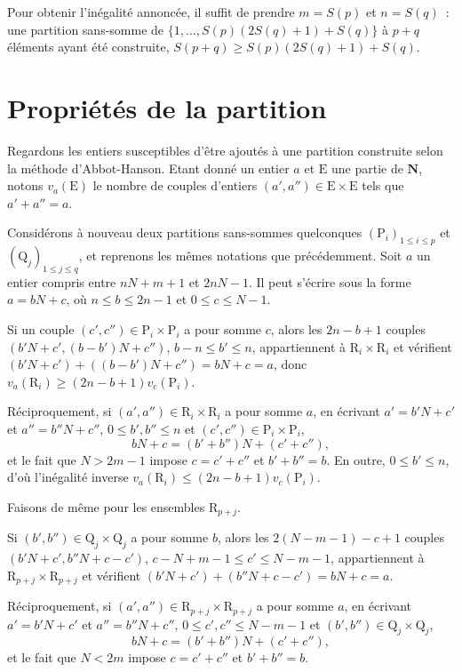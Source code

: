 \documentclass[11pt, oneside]{article}
\begin{document}
Pour obtenir l'inégalité annoncée, il suffit de prendre $m = S(p)$ et $n = S(q)$~:
une partition sans-somme de $\{1, \dots, S(p)(2S(q)+1) + S(q) \}$ à $p+q$ éléments ayant été construite, $S(p+q) \geqslant S(p)(2S(q)+1) + S(q)$.

\section{Propriétés de la partition}

Regardons les entiers susceptibles d'être ajoutés à une partition construite selon la méthode d'Abbot-Hanson.
Etant donné un entier $a$ et $\mathrm{E}$ une partie de $\mathbf{N}$, notons $v_a(\mathrm{E})$
le nombre de couples d'entiers $(a', a'') \in \mathrm{E}\times\mathrm{E}$ tels que $a' + a'' = a$.

Considérons à nouveau deux partitions sans-sommes quelconques $(\mathrm{P}_i)_{1 \leqslant i \leqslant p}$
et $(\mathrm{Q}_j)_{1 \leqslant j \leqslant q}$, et reprenons les mêmes notations que précédemment.
Soit $a$ un entier compris entre $nN + m + 1$ et $2nN - 1$.
Il peut s'écrire sous la forme $a = bN + c$, où $n \leqslant b \leqslant 2n-1$ et $0 \leqslant c \leqslant N-1$.

Si un couple $(c', c'') \in \mathrm{P}_i \times \mathrm{P}_i$ a pour somme $c$,
alors les $2n-b+1$ couples $(b' N + c', (b-b')N + c'')$, $b-n \leqslant b' \leqslant n$, appartiennent à $\mathrm{R}_i \times \mathrm{R}_i$
et vérifient $(b'N + c') + ((b-b')N + c'') = bN + c = a$, donc $v_a(\mathrm{R}_i) \geqslant (2n-b+1) v_c(\mathrm{P}_i)$.

Réciproquement, si $(a', a'') \in \mathrm{R}_i \times \mathrm{R}_i$ a pour somme $a$,
en écrivant $a' = b' N + c'$ et $a'' = b'' N + c''$, $0 \leqslant b', b'' \leqslant n$ et $(c', c'') \in \mathrm{P}_i \times \mathrm{P}_i$,
\[ bN + c = (b' + b'')N + (c'+c'') ,\]
et le fait que $N > 2m-1$ impose $c = c' + c''$ et $b' + b'' = b$.
En outre, $0 \leqslant b' \leqslant n$, d'où l'inégalité inverse $v_a(\mathrm{R}_i) \leqslant (2n-b+1) v_c(\mathrm{P}_i)$.

Faisons de même pour les ensembles $\mathrm{R}_{p+j}$.

Si $(b', b'') \in \mathrm{Q}_j \times \mathrm{Q}_j$ a pour somme $b$,
alors les $2(N-m-1)-c+1$ couples $(b' N + c', b''N + c - c')$, $c-N+m-1 \leqslant c' \leqslant N-m-1$, appartiennent à $\mathrm{R}_{p+j} \times \mathrm{R}_{p+j}$
et vérifient $(b'N + c') + (b''N + c-c') = bN + c = a$.

Réciproquement, si $(a', a'') \in \mathrm{R}_{p+j} \times \mathrm{R}_{p+j}$ a pour somme $a$,
en écrivant $a' = b' N + c'$ et $a'' = b'' N + c''$, $0 \leqslant c', c'' \leqslant N-m-1$ et $(b', b'') \in \mathrm{Q}_j \times \mathrm{Q}_j$,
\[ bN + c = (b' + b'')N + (c'+c'') ,\]
et le fait que $N < 2m$ impose $c = c' + c''$ et $b' + b'' = b$.
\end{document}
